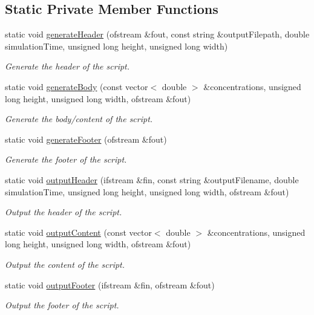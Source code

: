 \subsection*{\-Static \-Private \-Member \-Functions}
\begin{DoxyCompactItemize}
\item 
static void \hyperlink{classmultiscale_1_1video_1_1RectangularGnuplotScriptGenerator_abe3a62a21428183cdaf91c405c59264f}{generate\-Header} (ofstream \&fout, const string \&output\-Filepath, double simulation\-Time, unsigned long height, unsigned long width)
\begin{DoxyCompactList}\small\item\em \-Generate the header of the script. \end{DoxyCompactList}\item 
static void \hyperlink{classmultiscale_1_1video_1_1RectangularGnuplotScriptGenerator_ae8464c4b7b05d86ea8bcbfa5a26f7374}{generate\-Body} (const vector$<$ double $>$ \&concentrations, unsigned long height, unsigned long width, ofstream \&fout)
\begin{DoxyCompactList}\small\item\em \-Generate the body/content of the script. \end{DoxyCompactList}\item 
static void \hyperlink{classmultiscale_1_1video_1_1RectangularGnuplotScriptGenerator_a0b37e76bc9d825de0fd9d168f15a56be}{generate\-Footer} (ofstream \&fout)
\begin{DoxyCompactList}\small\item\em \-Generate the footer of the script. \end{DoxyCompactList}\item 
static void \hyperlink{classmultiscale_1_1video_1_1RectangularGnuplotScriptGenerator_a4b0c7a7b1e0b21dd2a432787ce8830d0}{output\-Header} (ifstream \&fin, const string \&output\-Filename, double simulation\-Time, unsigned long height, unsigned long width, ofstream \&fout)
\begin{DoxyCompactList}\small\item\em \-Output the header of the script. \end{DoxyCompactList}\item 
static void \hyperlink{classmultiscale_1_1video_1_1RectangularGnuplotScriptGenerator_a74e7f2fee2df4fc22a9ee3f1caee4e71}{output\-Content} (const vector$<$ double $>$ \&concentrations, unsigned long height, unsigned long width, ofstream \&fout)
\begin{DoxyCompactList}\small\item\em \-Output the content of the script. \end{DoxyCompactList}\item 
static void \hyperlink{classmultiscale_1_1video_1_1RectangularGnuplotScriptGenerator_a58ff6a7a353edb0dcda39ac8f1bac1c3}{output\-Footer} (ifstream \&fin, ofstream \&fout)
\begin{DoxyCompactList}\small\item\em \-Output the footer of the script. \end{DoxyCompactList}\end{DoxyCompactItemize}
